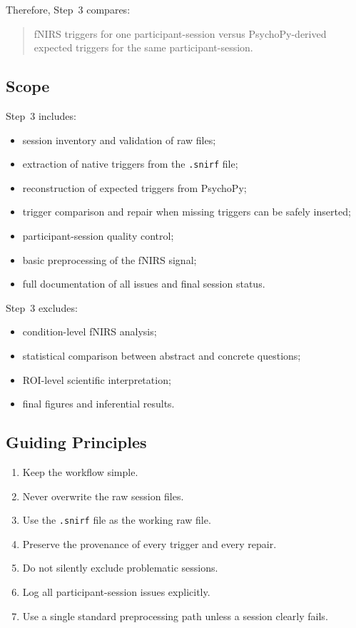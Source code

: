 Therefore, Step~3 compares:
\begin{quote}
fNIRS triggers for one participant-session \quad versus \quad PsychoPy-derived expected triggers
for the same participant-session.
\end{quote}

\subsection{Scope}
Step~3 includes:
\begin{itemize}
    \item session inventory and validation of raw files;
    \item extraction of native triggers from the \texttt{.snirf} file;
    \item reconstruction of expected triggers from PsychoPy;
    \item trigger comparison and repair when missing triggers can be safely inserted;
    \item participant-session quality control;
    \item basic preprocessing of the fNIRS signal;
    \item full documentation of all issues and final session status.
\end{itemize}

Step~3 excludes:
\begin{itemize}
    \item condition-level fNIRS analysis;
    \item statistical comparison between abstract and concrete questions;
    \item ROI-level scientific interpretation;
    \item final figures and inferential results.
\end{itemize}

\subsection{Guiding Principles}
\begin{enumerate}
    \item Keep the workflow simple.
    \item Never overwrite the raw session files.
    \item Use the \texttt{.snirf} file as the working raw file.
    \item Preserve the provenance of every trigger and every repair.
    \item Do not silently exclude problematic sessions.
    \item Log all participant-session issues explicitly.
    \item Use a single standard preprocessing path unless a session clearly fails.
\end{enumerate}

